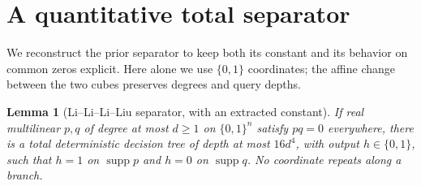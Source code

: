 \documentclass[11pt]{article}
\newtheorem{lemma}{Lemma}
\newcommand{\supp}{\operatorname{supp}}
\begin{document}
\section{A quantitative total separator}
We reconstruct the prior separator to keep both its constant and its
behavior on common zeros explicit. Here alone we use \(\{0,1\}\)
coordinates; the affine change between the two cubes preserves degrees
and query depths.

\begin{lemma}[Li--Li--Li--Liu separator, with an extracted constant]
\label{lem:separator}
If real multilinear \(p,q\) of degree at most \(d\ge1\) on \(\{0,1\}^n\)
satisfy \(pq=0\) everywhere, there is a total deterministic decision tree
of depth at most \(16d^4\), with output \(h\in\{0,1\}\), such that
\(h=1\) on \(\supp p\) and \(h=0\) on \(\supp q\).
No coordinate repeats along a branch.
\end{lemma}
\end{document}
